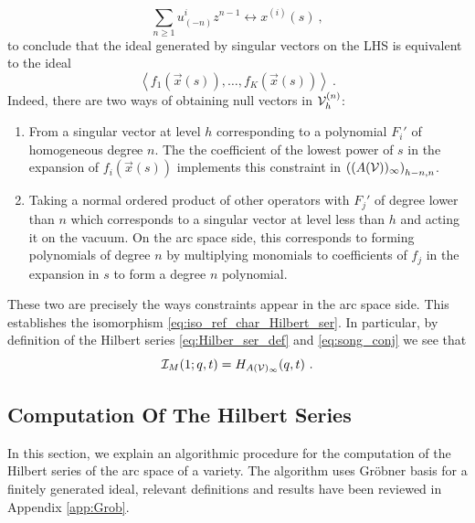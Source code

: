 \documentclass[a4paper,10pt]{article}
\newcommand{\tsf}[1]{\textsf{#1}}
\def\CV {{\cal V}}
\begin{document}
\begin{equation}
    \sum_{n\geq 1}u^i_{(-n)}z^{n-1}\longleftrightarrow x^{(i)}(s)~,
\end{equation}
to conclude that the ideal generated by singular vectors on the \tsf{LHS} is equivalent to the ideal 
\begin{equation}
    \left\langle f_1(\vec{x}(s)),\dots,f_K(\vec{x}(s))\right\rangle~.
\end{equation}
Indeed, there are two ways of obtaining null vectors in $\CV^{(n)}_h$: 
\begin{enumerate}
    \item From a singular vector at level $h$ corresponding to a polynomial $F_i'$ of homogeneous degree $n$. The the coefficient of the lowest power of $s$ in the expansion of $f_i(\vec{x}(s))$ implements this constraint in $\left((A(\CV))_\infty\right)_{h-n,n}$.
    \item Taking a normal ordered product of other operators with $F_j'$ of degree lower than $n$  which corresponds to a singular vector at level less than $h$ and acting it on the vacuum. On the arc space side, this corresponds to forming polynomials of degree $n$ by multiplying monomials to coefficients of $f_j$ in the expansion in $s$ to form a degree $n$ polynomial.   
\end{enumerate}
These two are precisely the ways constraints appear in the arc space side. This establishes the isomorphism \eqref{eq:iso_ref_char_Hilbert_ser}. In particular, by definition of the Hilbert series \eqref{eq:Hilber_ser_def} and \eqref{eq:song_conj} we see that 
\begin{equation}
\mathcal{I}_M(1;q,t)= H_{A(\CV)_\infty}(q,t)~.   
\end{equation}
\subsection{Computation Of The Hilbert Series}\label{sec:comp_Hilb_ser}
In this section, we explain an algorithmic procedure for the computation of the Hilbert series of the arc space of a variety. The algorithm uses Gr\"{o}bner basis for a finitely generated ideal, relevant definitions and results have been reviewed in Appendix \ref{app:Grob}. 
\end{document}
